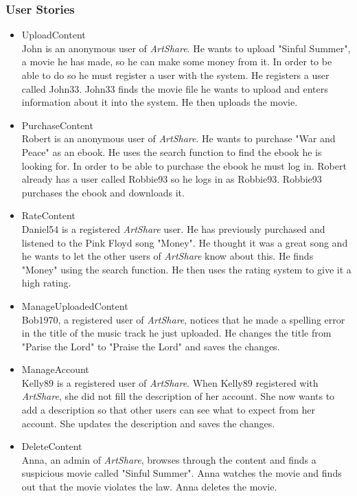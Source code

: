 \subsubsection{User Stories}
\label{sec:User Stories}
\begin{itemize}
\item UploadContent \\
John is an anonymous user of \textit{ArtShare}. He wants to upload "Sinful Summer", a movie he has made, so he can make some money from it. In order to be able to do so he must register a user with the system. He registers a user called John33. John33 finds the movie file he wants to upload and enters information about it into the system. He then uploads the movie.
\item PurchaseContent \\
Robert is an anonymous user of \textit{ArtShare}. He wants to purchase "War and Peace" as an ebook. He uses the search function to find the ebook he is looking for. In order to be able to purchase the ebook he must log in. Robert already has a user called Robbie93 so he logs in as Robbie93. Robbie93 purchases the ebook and downloads it.
\item RateContent \\
Daniel54 is a registered \textit{ArtShare} user. He has previously purchased and listened to the Pink Floyd song "Money". He thought it was a great song and he wants to let the other users of \textit{ArtShare} know about this. He finds "Money" using the search function. He then uses the rating system to give it a high rating.
\item ManageUploadedContent \\
Bob1970, a registered user of \textit{ArtShare}, notices that he made a spelling error in the title of the music track he just uploaded. He changes the title from "Parise the Lord" to "Praise the Lord" and saves the changes.
\item ManageAccount \\
Kelly89 is a registered user of \textit{ArtShare}. When Kelly89 registered with \textit{ArtShare}, she did not fill the description of her account. She now wants to add a description so that other users can see what to expect from her account. She updates the description and saves the changes.
\item DeleteContent \\
Anna, an admin of \textit{ArtShare}, browses through the content and finds a suspicious movie called "Sinful Summer". Anna watches the movie and finds out that the movie violates the law. Anna deletes the movie.
\end{itemize}

%
